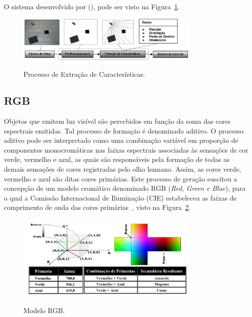 O sistema desenvolvido por \citeauthor{andrade2006sistema} (\citeyear{andrade2006sistema}), pode ser visto na Figura~\ref{fig:triangulacao}.

\begin{figure}[!hbtp]
  \centering
   \caption{Processo de Extração de Características.}
    \includegraphics[width = 0.8\textwidth]{Caps/Figs/ref-teorico/triangulacao.png}
   \label{fig:triangulacao}
\end{figure}


\subsection{RGB}
\label{subsec:rgb}

Objetos que emitem luz visível são percebidos em função da soma das cores espectrais emitidas. Tal processo de formação é denominado aditivo. O processo aditivo pode ser interpretado como uma combinação variável em proporção de componentes monocromáticas nas faixas espectrais associadas às sensações de cor verde, vermelho e azul, as quais são responsáveis pela formação de todas as demais sensações de cores registradas pelo olho humano. Assim, as cores verde, vermelho e azul são ditas cores primárias. Este processo de geração suscitou a concepção de um modelo cromático denominado RGB (\textit{Red, Green e Blue}), para o qual a Comissão Internacional de Iluminação (CIE) estabeleceu as faixas de comprimento de onda das cores primárias~\cite{de2006introduccao}, visto na Figura~\ref{fig:modeloRGB}.

\begin{figure}[!hbtp]
  \centering
   \caption{Modelo RGB.}
    \includegraphics[width = 0.8\textwidth]{Caps/Figs/ref-teorico/modelo-RGB.png}
   \label{fig:modeloRGB}
\end{figure}

